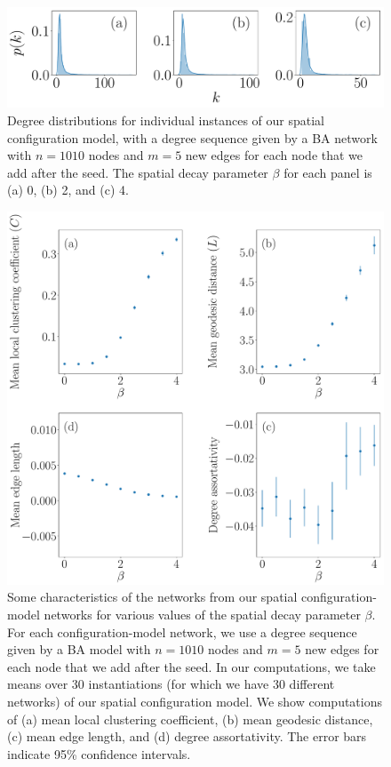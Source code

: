\documentclass[%
 reprint,
 amsmath,amssymb,
 aps,
]{revtex4-1}
\begin{document}
\begin{figure}
    \centering
    \includegraphics[width=1.0\linewidth]{spatial_configuration_degree_distribution.pdf}
    \caption{Degree distributions for individual instances of our spatial configuration 
     model, with a degree sequence given by a BA network with $n=1010$ nodes and $m=5$ new edges for each node that we add after the seed. The spatial decay parameter $\beta$ for each panel is (a) 0, (b) 2, and (c) 4.
     }
\end{figure}


\begin{figure}
    \centering
    \includegraphics[width=1.0\linewidth]{spatial_configuration_metrics3.pdf}
    \caption{Some characteristics of the networks from our spatial configuration-model networks for various values of the spatial decay parameter $\beta$. For each configuration-model network, we use a degree sequence given by a BA model with $n=1010$ nodes and $m=5$ new edges for each node that we add after the seed. In our computations, we take means over $30$ instantiations (for which we have 30 different networks) of our spatial configuration model.
     We show computations of (a) mean local clustering coefficient, (b) mean geodesic distance, (c) mean edge length, and (d) degree assortativity. The error bars indicate 95\% confidence intervals.
    }
    \label{fig:spatial_configuration_metrics}
\end{figure}
\end{document}
